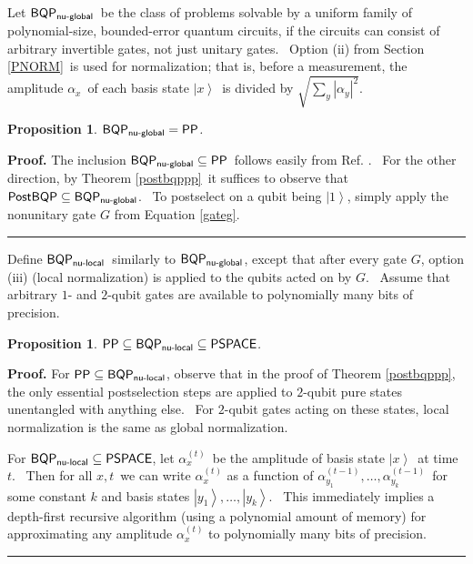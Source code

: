\documentclass[12pt]{article}%
\newtheorem{proposition}[theorem]{Proposition}
\newenvironment{proof}[1][Proof]{\noindent\textbf{#1.} }{\ \rule{0.5em}{0.5em}}
\begin{document}
Let $\mathsf{BQP}_{\text{\textsf{nu-global}}}$\ be the class of problems
solvable by a uniform family of polynomial-size, bounded-error quantum
circuits, if the circuits can consist of arbitrary invertible gates, not just
unitary gates. \ Option (ii) from Section \ref{PNORM}\ is used for
normalization; that is, before a measurement, the amplitude $\alpha_{x}$\ of
each basis state $\left\vert x\right\rangle $\ is divided by $\sqrt{\sum
_{y}\left\vert \alpha_{y}\right\vert ^{2}}$.

\begin{proposition}
\label{nuglobal}$\mathsf{BQP}_{\text{\textsf{nu-global}}}=\mathsf{PP}$.
\end{proposition}

\begin{proof}
The inclusion $\mathsf{BQP}_{\text{\textsf{nu-global}}}\subseteq\mathsf{PP}%
$\ follows easily from Ref. \cite{adh}. \ For the other direction, by Theorem
\ref{postbqppp}\ it suffices to observe that $\mathsf{PostBQP}\subseteq
\mathsf{BQP}_{\text{\textsf{nu-global}}}$. \ To postselect on a qubit being
$\left\vert 1\right\rangle $, simply apply the nonunitary gate $G$ from
Equation \ref{gateg}.
\end{proof}

Define $\mathsf{BQP}_{\text{\textsf{nu-local}}}$\ similarly to $\mathsf{BQP}%
_{\text{\textsf{nu-global}}}$, except that after every gate $G$, option (iii)
(local normalization) is applied to the qubits acted on by $G$. \ Assume that
arbitrary $1$- and $2$-qubit gates are available to polynomially many bits of precision.

\begin{proposition}
\label{nulocal}$\mathsf{PP}\subseteq\mathsf{BQP}_{\text{\textsf{nu-local}}%
}\subseteq\mathsf{PSPACE}$.
\end{proposition}

\begin{proof}
For $\mathsf{PP}\subseteq\mathsf{BQP}_{\text{\textsf{nu-local}}}$, observe
that in the proof of Theorem \ref{postbqppp}, the only essential postselection
steps are applied to $2$-qubit pure states unentangled with anything else.
\ For $2$-qubit gates acting on these states, local normalization is the same
as global normalization.

For $\mathsf{BQP}_{\text{\textsf{nu-local}}}\subseteq\mathsf{PSPACE}$, let
$\alpha_{x}^{\left(  t\right)  }$\ be the amplitude of basis state $\left\vert
x\right\rangle $\ at time $t$. \ Then for all $x,t$\ we can write $\alpha
_{x}^{\left(  t\right)  }$ as a function of $\alpha_{y_{1}}^{\left(
t-1\right)  },\ldots,\alpha_{y_{k}}^{\left(  t-1\right)  }$\ for some constant
$k$ and basis states $\left\vert y_{1}\right\rangle ,\ldots,\left\vert
y_{k}\right\rangle $. \ This immediately implies a depth-first recursive
algorithm (using a polynomial amount of memory) for approximating any
amplitude $\alpha_{x}^{\left(  t\right)  }$ to polynomially many bits of precision.
\end{proof}
\end{document}
